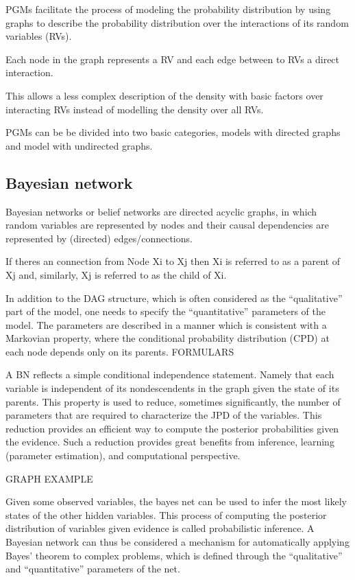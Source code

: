 PGMs facilitate the process of modeling the probability distribution by using graphs to describe the probability distribution over the interactions of its random variables (RVs).

Each node in the graph represents a RV and each edge between to RVs a direct interaction.

This allows a less complex description of the density with basic factors over interacting RVs instead of modelling the density over all RVs. 

PGMs can be be divided into two basic categories, models with directed graphs and model with undirected graphs.


\subsection{Bayesian network}

Bayesian networks or belief networks are directed acyclic graphs, in which random variables are represented by nodes and their causal dependencies are represented by (directed) edges/connections. 

If theres an connection from Node Xi to Xj then Xi is referred to as a parent of Xj and, similarly, Xj is referred to as the child of Xi.

In addition to the DAG structure, which is often considered as the “qualitative” part of the model, one needs to specify the “quantitative” parameters of the model. 
The parameters are described in a manner which is consistent with a Markovian property, where the conditional probability distribution (CPD) at each node depends only on its parents. 
FORMULARS

A BN reflects a simple conditional independence statement. Namely that each variable is independent of its nondescendents in the graph given the state of its parents. 
This property is used to reduce, sometimes significantly, the number of parameters that are required to characterize the JPD of the variables. 
This reduction provides an efficient way to compute the posterior probabilities given the evidence.
Such a reduction provides great benefits from inference, learning (parameter estimation),
and computational perspective.

GRAPH EXAMPLE

Given some observed variables, the bayes net can be used to infer the most likely states of the other hidden variables. 
This process of computing the posterior distribution of variables given evidence is called probabilistic inference.
A Bayesian network can thus be considered a mechanism for automatically applying Bayes' theorem to complex problems, which is defined through the “qualitative” and  “quantitative” parameters of the net.


